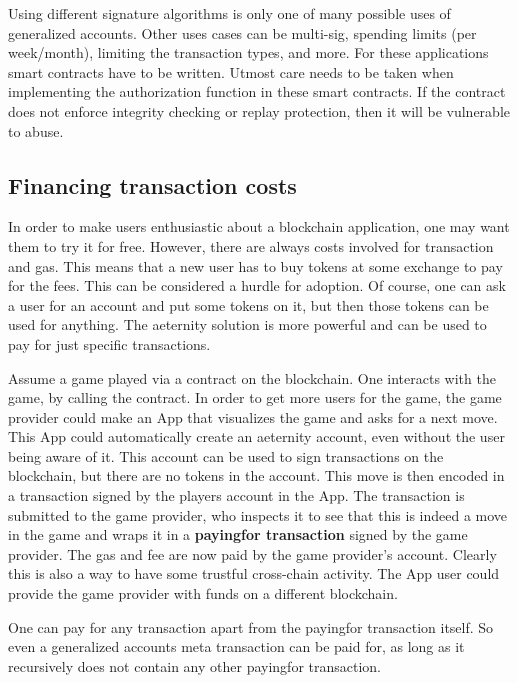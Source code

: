 Using different signature algorithms is only one of many possible uses
of generalized accounts. Other uses cases can be multi-sig, spending
limits (per week/month), limiting the transaction types, and more. For
these applications smart contracts have to be written. Utmost care
needs to be taken when implementing the authorization
function in these smart contracts. If the contract does not enforce
integrity checking or replay protection, then it will be vulnerable to
abuse.


\subsection{Financing transaction costs}
\label{sect:payingfor}

In order to make users enthusiastic about a blockchain application,
one may want them to try it for free. However, there are always costs
involved for transaction and gas. This means that a new user has to
buy tokens at some exchange to pay for the fees. This can be considered
a hurdle for adoption. Of course, one can ask a user for an account and put
some tokens on it, but then those tokens can be used for anything.
The aeternity solution is more powerful and can be used to pay for
just specific transactions.

Assume a game played via a contract on the blockchain. One interacts
with the game, by calling the contract. In order to get more users for
the game, the game provider could make an App that visualizes
the game and asks for a next move. This App could automatically create
an aeternity account, even without the user being aware of it. This
account can be used to sign transactions on the blockchain, but there
are no tokens in the account. This move is then encoded in a
transaction signed by the players account in the App. The transaction
is submitted to the game provider, who inspects it to see that this
is indeed a move in the game and wraps it in a \textbf{payingfor
  transaction} signed by the game provider. The gas and fee are now
paid by the game provider's account.
Clearly this is also a way to have some trustful cross-chain
activity. The App user could provide the game provider with funds on a
different blockchain.

One can pay for any transaction apart from the payingfor transaction
itself. So even a generalized accounts meta transaction can be paid
for, as long as it recursively does not contain any other payingfor
transaction.

